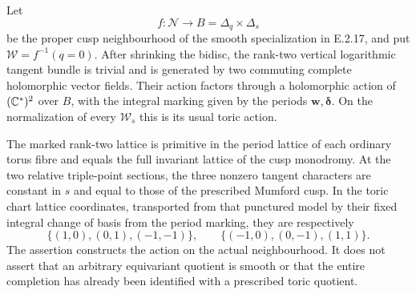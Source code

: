 \begin{proposition}
Let
\[
 f:\mathcal N\longrightarrow
 B=\Delta_q\times\Delta_s
\]
be the proper cusp neighbourhood of the smooth
specialization in E.2.17, and put
$\mathcal W=f^{-1}(q=0)$.  After shrinking the
bidisc, the rank-two vertical logarithmic tangent
bundle is trivial and is generated by two commuting
complete holomorphic vector fields.  Their action
factors through a holomorphic action of
$(\mathbb C^*)^2$ over $B$, with the integral marking
given by the periods $\mathbf w,\boldsymbol\delta$.
On the normalization of every $\mathcal W_s$
this is its usual toric action.

The marked rank-two lattice is primitive in the
period lattice of each ordinary torus fibre and
equals the full invariant lattice of the cusp
monodromy.  At the two relative triple-point
sections, the three nonzero tangent characters
are constant in $s$ and equal to those of the
prescribed Mumford cusp.  In the toric chart
lattice coordinates, transported from that
punctured model by their fixed integral change
of basis from the period marking, they are
respectively
\[
 \{(1,0),(0,1),(-1,-1)\},\qquad
 \{(-1,0),(0,-1),(1,1)\}.
 \tag{E.2.19.1}
\]
The assertion constructs the action on the actual
neighbourhood.  It does not assert that an
arbitrary equivariant quotient is smooth or
that the entire completion has already been
identified with a prescribed toric quotient.
\end{proposition}
